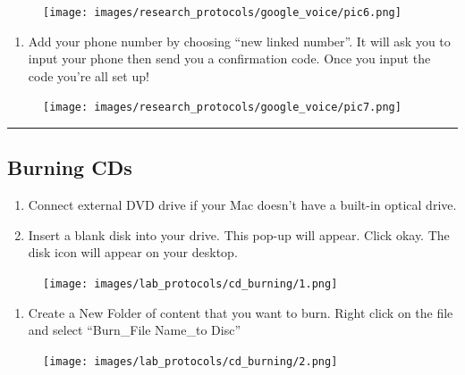 \documentclass[
]{book}
\providecommand{\tightlist}{%
  \setlength{\itemsep}{0pt}\setlength{\parskip}{0pt}}
\begin{document}
\begin{figure}
\centering
\texttt{[image: images/research\_protocols/google\_voice/pic6.png]}
\caption{}
\end{figure}

\begin{enumerate}
\def\labelenumi{\arabic{enumi})}
\setcounter{enumi}{6}
\tightlist
\item
  Add your phone number by choosing ``new linked number''. It will ask you to input your phone then send you a confirmation code. Once you input the code you're all set up!
\end{enumerate}

\begin{figure}
\centering
\texttt{[image: images/research\_protocols/google\_voice/pic7.png]}
\caption{}
\end{figure}

\begin{center}\rule{0.5\linewidth}{0.5pt}\end{center}

\hypertarget{burning-cds}{%
\subsection{Burning CDs}\label{burning-cds}}

\begin{enumerate}
\def\labelenumi{\arabic{enumi}.}
\item
  Connect external DVD drive if your Mac doesn't have a built-in optical drive.
\item
  Insert a blank disk into your drive. This pop-up will appear. Click okay. The disk icon will appear on your desktop.
\end{enumerate}

\begin{figure}
\centering
\texttt{[image: images/lab\_protocols/cd\_burning/1.png]}
\caption{}
\end{figure}

\begin{enumerate}
\def\labelenumi{\arabic{enumi}.}
\setcounter{enumi}{2}
\tightlist
\item
  Create a New Folder of content that you want to burn. Right click on the file and select ``Burn\_File Name\_to Disc''
\end{enumerate}

\begin{figure}
\centering
\texttt{[image: images/lab\_protocols/cd\_burning/2.png]}
\caption{}
\end{figure}
\end{document}
